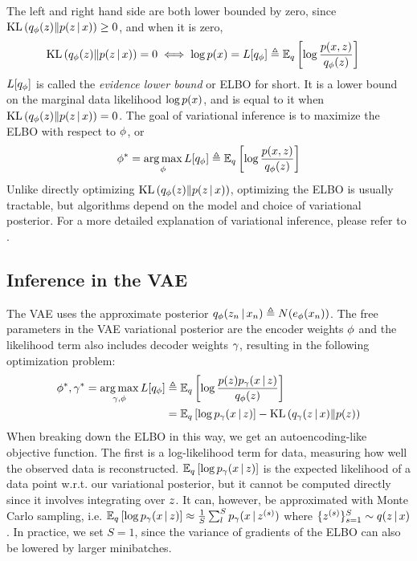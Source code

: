 The left and right hand side are both lower bounded by zero,
since $\mathrm{KL}\left(q_\phi(z)\|p(z \,|\, x)\right) \geq 0$,
and when
it is zero,
\begin{align*}
    \mathrm{KL}\left(q_\phi(z)\|p(z \,|\, x)\right) = 0 \iff \log p(x) &= L[q_\phi] \triangleq \mathbb{E}_q\left[\log \frac{p(x, z)}{q_\phi(z)}\right] 
\end{align*}
$L[q_\phi]$ is called the
\emph{evidence lower bound} or ELBO for short.
It is a lower bound on the marginal data
likelihood $\log p(x)$, and is equal 
to it when $\mathrm{KL}\left(q_\phi(z)\|p(z \,|\, x)\right) = 0$.
The goal of variational inference is to maximize the ELBO with respect to $\phi$, or
\begin{align*}
\phi^* = \operatorname*{arg\,max}_\phi L[q_\phi] \triangleq \mathbb{E}_q\left[\log \frac{p(x, z)}{q_\phi(z)}\right] 
\end{align*}
Unlike directly optimizing $\mathrm{KL}\left(q_\phi(z)\|p(z \,|\, x)\right)$, optimizing the ELBO is usually tractable, but algorithms
depend on the model and choice of variational posterior.
For a more detailed explanation of variational inference,
please refer to \citet{Blei2017}.

\subsection{Inference in the VAE}
The VAE uses the approximate posterior
$q_\phi(z_n \,|\, x_n) \triangleq N(e_\phi(x_n))$.
The free parameters in the VAE 
variational posterior are the
encoder weights $\phi$ 
and the likelihood term
also includes decoder weights $\gamma$, resulting
in the following optimization problem:
\begin{align*}
\phi^*,\gamma^* = \operatorname*{arg\,max}_{\gamma, \phi} L[q_\phi] &\triangleq \mathbb{E}_q\left[\log \frac{p(z)p_\gamma(x \,|\, z)}{q_\phi(z)}\right] \\
&= \mathbb{E}_q \left[ \log p_\gamma(x \,|\, z)\right] - \mathrm{KL}\left(q_\gamma(z \,|\, x)\|p(z)\right)
\end{align*}
When breaking down the ELBO in this way,
we get an autoencoding-like objective function.
The first is a log-likelihood term for data, measuring how well the observed data is reconstructed.
$\mathbb{E}_q \left[ \log p_\gamma(x \,|\, z)\right]$ is 
the expected likelihood of a data point w.r.t.
our variational posterior, but it cannot be computed directly
since it involves integrating over
$z$. It can, however, 
be approximated with Monte Carlo sampling, i.e. $\mathbb{E}_q \left[ \log p_\gamma(x \,|\, z)\right] \approx \frac{1}{S}\sum_{l}^S p_\gamma(x \,|\, z^{(s)})$ where $\{z^{(s)}\}_{s = 1}^S \sim q(z \,|\, x)$.
In practice, we set $S = 1$, since the variance of gradients
of the ELBO can also be lowered by larger minibatches.

